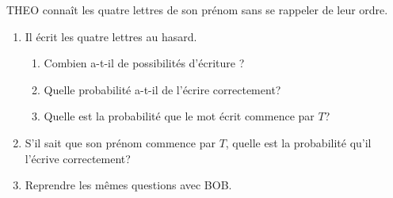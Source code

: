 


\begin{exercice}
THEO connaît les quatre lettres de son prénom sans se rappeler de leur ordre.
    \begin{enumerate}
        \item Il écrit les quatre lettres au hasard. 
            \begin{enumerate}
                \item Combien a-t-il de possibilités d'écriture ?
                \item Quelle probabilité a-t-il de l'écrire correctement?
                \item Quelle est la probabilité que le mot écrit commence par $T$?
            \end{enumerate}
        \item S'il sait que son prénom commence par $T$, quelle est la 
probabilité qu'il l'écrive correctement?
       \item Reprendre les mêmes questions avec BOB.
    \end{enumerate}
\end{exercice}

